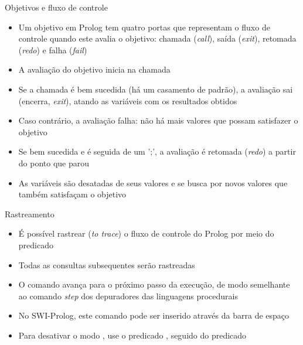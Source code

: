 \begin{frame}[fragile]{Objetivos e fluxo de controle}

    \begin{itemize}
        \item Um objetivo em Prolog tem quatro portas que representam o fluxo de controle
            quando este avalia o objetivo: chamada 
            (\textit{call}), saída (\textit{exit}), retomada (\textit{redo}) e falha 
            (\textit{fail})

        \item A avaliação do objetivo inicia na chamada

        \item Se a chamada é bem sucedida (há um casamento de padrão), a avaliação sai 
            (encerra, \textit{exit}), atando as variáveis com os resultados obtidos

        \item Caso contrário, a avaliação falha: não há mais valores que possam satisfazer o 
            objetivo

        \item Se bem sucedida e é seguida de um ';', a avaliação é retomada (\textit{redo}) a
            partir do ponto que parou 

        \item As variáveis são desatadas de seus valores e se busca por novos valores que 
            também satisfaçam o objetivo
    \end{itemize}

\end{frame}



\begin{frame}[fragile]{Rastreamento}

    \begin{itemize}
        \item É possível rastrear (\textit{to trace}) o fluxo de controle do Prolog por meio
            do predicado 

        \item Todas as consultas subsequentes serão rastreadas

        \item O comando  avança para o próximo passo da execução, de modo
            semelhante ao comando \textit{step} dos depuradores das linguagens procedurais

        \item No SWI-Prolog, este comando pode ser inserido através da barra de espaço

        \item Para desativar o modo , use o predicado 
            , seguido do predicado 

    \end{itemize}

\end{frame}



